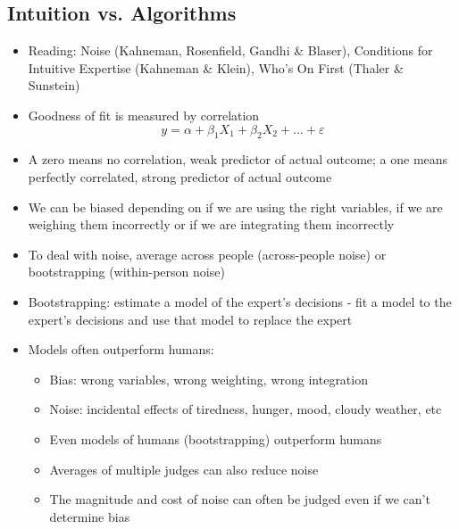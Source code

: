\documentclass[12pt]{article}
\begin{document}
\subsection{Intuition vs. Algorithms}
\begin{itemize}
\item Reading: Noise (Kahneman, Rosenfield, Gandhi \& Blaser), Conditions for Intuitive Expertise (Kahneman \& Klein), Who's On First (Thaler \& Sunstein)
\item Goodness of fit is measured by correlation $$ y = \alpha + \beta_1X_1 + \beta_2X_2 + \dots + \varepsilon $$ 
\item A zero means no correlation, weak predictor of actual outcome; a one means perfectly correlated, strong predictor of actual outcome 
\item We can be biased depending on if we are using the right variables, if we are weighing them incorrectly or if we are integrating them incorrectly 
\item To deal with noise, average across people (across-people noise) or bootstrapping (within-person noise) 
\item Bootstrapping: estimate a model of the expert's decisions - fit a model to the expert's decisions and use that model to replace the expert 
\item Models often outperform humans: \begin{itemize} 
\item Bias: wrong variables, wrong weighting, wrong integration 
\item Noise: incidental effects of tiredness, hunger, mood, cloudy weather, etc 
\item Even models of humans (bootstrapping) outperform humans 
\item Averages of multiple judges can also reduce noise 
\item The magnitude and cost of noise can often be judged even if we can't determine bias \end{itemize} 
\end{itemize}
\newpage
\end{document}
